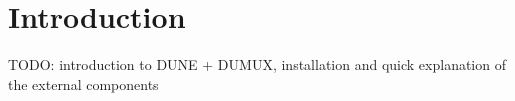 \chapter{Introduction}

TODO: introduction to DUNE + DUMUX, installation and quick explanation of the external components